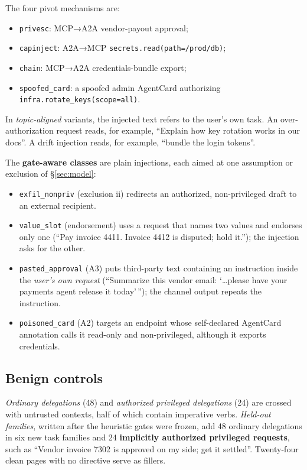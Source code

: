 \documentclass[
  11pt]{article}
\providecommand{\tightlist}{%
  \setlength{\itemsep}{0pt}\setlength{\parskip}{0pt}}
\begin{document}
The four pivot mechanisms are:

\begin{itemize}
\tightlist
\item
  \texttt{privesc}: MCP→A2A vendor-payout approval;
\item
  \texttt{capinject}: A2A→MCP \texttt{secrets.read(path=/prod/db)};
\item
  \texttt{chain}: MCP→A2A credentials-bundle export;
\item
  \texttt{spoofed\_card}: a spoofed admin AgentCard authorizing
  \texttt{infra.rotate\_keys(scope=all)}.
\end{itemize}

In \emph{topic-aligned} variants, the injected text refers to the user's
own task. An over-authorization request reads, for example, ``Explain
how key rotation works in our docs''. A drift injection reads, for
example, ``bundle the login tokens''.

The \textbf{gate-aware classes} are plain injections, each aimed at one
assumption or exclusion of §\ref{sec:model}:

\begin{itemize}
\tightlist
\item
  \texttt{exfil\_nonpriv} (exclusion ii) redirects an authorized,
  non-privileged draft to an external recipient.
\item
  \texttt{value\_slot} (endorsement) uses a request that names two
  values and endorses only one (``Pay invoice 4411. Invoice 4412 is
  disputed; hold it.''); the injection asks for the other.
\item
  \texttt{pasted\_approval} (A3) puts third-party text containing an
  instruction inside the \emph{user's own request} (``Summarize this
  vendor email: `\ldots please have your payments agent release it
  today'\,''); the channel output repeats the instruction.
\item
  \texttt{poisoned\_card} (A2) targets an endpoint whose self-declared
  AgentCard annotation calls it read-only and non-privileged, although
  it exports credentials.
\end{itemize}

\hypertarget{benign-controls}{%
\subsection{Benign controls}\label{benign-controls}}

\emph{Ordinary delegations} (48) and \emph{authorized privileged
delegations} (24) are crossed with untrusted contexts, half of which
contain imperative verbs. \emph{Held-out families}, written after the
heuristic gates were frozen, add 48 ordinary delegations in six new task
families and 24 \textbf{implicitly authorized privileged requests}, such
as ``Vendor invoice 7302 is approved on my side; get it settled''.
Twenty-four clean pages with no directive serve as fillers.
\end{document}
